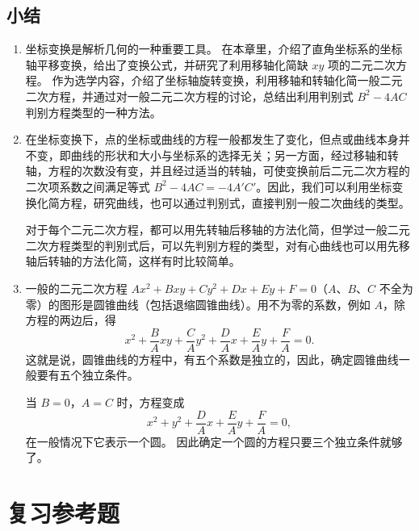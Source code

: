 \section*{小结}
\begin{enumerate}[C、,itemindent=4.5em]
  \item 坐标变换是解析几何的一种重要工具。
  在本章里，介绍了直角坐标系的坐标轴平移变换，给出了变换公式，并研究了利用移轴化简缺 $xy$ 项的二元二次方程。
  作为选学内容，介绍了坐标轴旋转变换，利用移轴和转轴化简一般二元二次方程，并通过对一般二元二次方程的讨论，总结出利用判别式 $B^2-4AC$ 判别方程类型的一种方法。
  \item 在坐标变换下，点的坐标或曲线的方程一般都发生了变化，但点或曲线本身并不变，即曲线的形状和大小与坐标系的选择无关；另一方面，经过移轴和转轴，方程的次数没有变，并且经过适当的转轴，可使变换前后二元二次方程的二次项系数之间满足等式 $B^2- 4AC=-4A'C'$。因此，我们可以利用坐标变换化简方程，研究曲线，也可以通过判别式，直接判别一般二次曲线的类型。
  
  对于每个二元二次方程，都可以用先转轴后移轴的方法化简，但学过一般二元二次方程类型的判别式后，可以先判别方程的类型，对有心曲线也可以用先移轴后转轴的方法化简，这样有时比较简单。
  \item 一般的二元二次方程 $Ax^2+Bxy+Cy^2+Dx+Ey+F=0$（$A$、$B$、$C$ 不全为零）的图形是圆锥曲线（包括退缩圆锥曲线）。用不为零的系数，例如 $A$，除方程的两边后，得
  \[x^2+\frac{B}{A}xy+\frac{C}{A}y^2+\frac{D}{A}x+\frac{E}{A}y+\frac{F}{A}=0.\]
  这就是说，圆锥曲线的方程中，有五个系数是独立的，因此，确定圆锥曲线一般要有五个独立条件。

  当 $B=0$，$A=C$ 时，方程变成
  \[x^2+y^2+\frac{D}{A}x+\frac{E}{A}y+\frac{F}{A}=0,\]
  在一般情况下它表示一个圆。
  因此确定一个圆的方程只要三个独立条件就够了。
\end{enumerate}
\chapter*{复习参考题}
